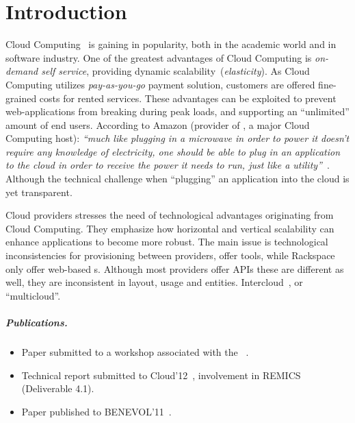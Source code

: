 \chapter{Introduction}

Cloud Computing~\cite{Armbrust:EECS-2009-28} is gaining in popularity,
both in the academic world and in software industry.
One of the greatest advantages of Cloud Computing is \emph{on-demand self service},
providing dynamic scalability~(\emph{elasticity}).
As Cloud Computing utilizes \emph{pay-as-you-go} payment solution,
customers are offered fine-grained costs for rented services.
These advantages can be exploited to prevent web-applications
from breaking during peak loads, and supporting an ``unlimited''
amount of end users.
According to Amazon (provider of , a major Cloud Computing host):
\emph{``much like plugging in a microwave
in order to power it doesn't require any knowledge of electricity,
one should be able to plug in an application to the cloud in order
to receive the power it needs to run, 
just like a utility''}~\cite{aws:varia10}.
Although the technical challenge when ``plugging'' an application into the cloud
is yet transparent.

Cloud providers stresses the need of technological advantages originating from Cloud Computing.
They emphasize how horizontal and vertical scalability can enhance applications
to become more robust.
The main issue is technological inconsistencies for provisioning between providers,
\eg {} offer  tools, while Rackspace only offer web-based s.
Although most providers offer APIs these are different as well, 
they are inconsistent in layout, usage and entities.
Intercloud~\cite{intercloud}, or ``multicloud''.

\paragraph{Publications.}

\begin{itemize}
  \item
    Paper submitted to a workshop associated with the ~\cite{ecmfa4clouda}.
  \item
    Technical report submitted to Cloud'12~\cite{remics_4_1}, 
    involvement in REMICS (Deliverable 4.1).
  \item
    Paper published to BENEVOL'11~\cite{mosser-brandtzæg-etal:2011}.
\end{itemize}
